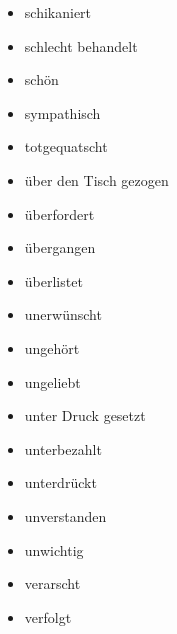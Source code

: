 \begin{multicols}{2}
\begin{itemize}
    \item schikaniert
    \item schlecht behandelt
    \item schön
    \item sympathisch
    \item totgequatscht
    \item über den Tisch gezogen
    \item überfordert
    \item übergangen
    \item überlistet
    \item unerwünscht
    \item ungehört
    \item ungeliebt
    \item unter Druck gesetzt
    \item unterbezahlt
    \item unterdrückt
    \item unverstanden
    \item unwichtig
    \item verarscht
    \item verfolgt
  \end{itemize}
\end{multicols}
